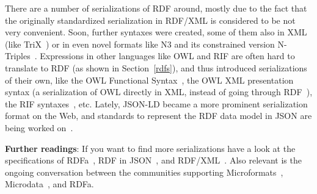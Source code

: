 There are a number of serializations of \ac{RDF} around, mostly due to the fact that the originally standardized serialization in RDF/XML is considered to be not very convenient.
Soon, further syntaxes were created, some of them also in XML (like TriX~\cite{trix}) or in even novel formats like N3 and its constrained version N-Triples~\cite{ntriples}.
Expressions in other languages like OWL and RIF are often hard to translate to \ac{RDF} (as shown in Section~\ref{rdfs}), and thus introduced serializations of their own, like the OWL Functional Syntax~\cite{owl2}, the OWL XML presentation syntax (a serialization of OWL directly in XML, instead of going through \ac{RDF}~\cite{owl3}), the RIF syntaxes~\cite{rif}, etc.
Lately, JSON-LD became a more prominent serialization format on the Web, and standards to represent the \ac{RDF} data model in JSON are being worked on~\cite{json-ld}.



\medskip

\textbf{Further readings}:
If you want to find more serializations have a look at the specifications of RDFa~\cite{rdfa}, RDF in JSON~\cite{json-ld}, and RDF/XML~\cite{rdfxml}.
Also relevant is the ongoing conversation between the communities supporting Microformats~\cite{microformats}, Microdata~\cite{microdata}, and RDFa.

